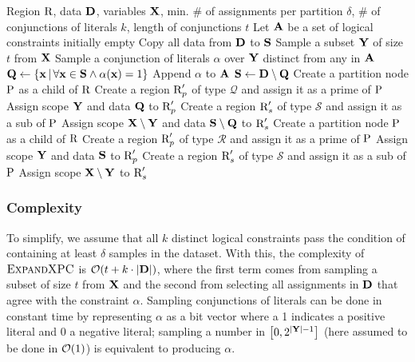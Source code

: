 \begin{algorithm}[t]
  \caption{}\label{alg:xpcs-expand}
  \begin{algorithmic}[1]
    \Require Region $\operatorname{\textrm{R}}$, data $\mathbf{D}$, variables $\mathbf{X}$, min. \# of assignments per
      partition $\delta$, \# of conjunctions of literals $k$, length of conjunctions $t$
    \State Let $\mathbf{A}$ be a set of logical constraints initially empty
    \State Copy all data from $\mathbf{D}$ to $\mathbf{S}$
    \State Sample a subset $\mathbf{Y}$ of size $t$ from $\mathbf{X}$\label{alg:xpcs-expand:line:sample}
      \State Sample a conjunction of literals $\alpha$ over $\mathbf{Y}$ distinct from any in $\mathbf{A}$
      \State $\mathbf{Q}\gets\{\mathbf{x}\,|\,\forall\mathbf{x}\in\mathbf{S}\wedge\alpha(\mathbf{x})=1\}$
        \State Append $\alpha$ to $\mathbf{A}$
        \State $\mathbf{S}\gets\mathbf{D}\setminus\mathbf{Q}$
        \State Create a partition node $\operatorname{\textrm{P}}$ as a child of $\operatorname{\textrm{R}}$
        \State Create a region $\operatorname{\textrm{R}}_p'$ of type $\mathcal{Q}$ and assign it as a prime of
          $\operatorname{\textrm{P}}$
        \State Assign scope $\mathbf{Y}$ and data $\mathbf{Q}$ to $\operatorname{\textrm{R}}_p'$
        \State Create a region $\operatorname{\textrm{R}}_s'$ of type $\mathcal{S}$ and assign it as a sub of
          $\operatorname{\textrm{P}}$
        \State Assign scope $\mathbf{X}\setminus\mathbf{Y}$ and data $\mathbf{S}\setminus\mathbf{Q}$ to $\operatorname{\textrm{R}}_s'$
      \EndIf
    \EndWhile
    \NIElse
      \State Create a partition node $\operatorname{\textrm{P}}$ as a child of $\operatorname{\textrm{R}}$
      \State Create a region $\operatorname{\textrm{R}}_p'$ of type $\mathcal{R}$ and assign it as a prime of
        $\operatorname{\textrm{P}}$
      \State Assign scope $\mathbf{Y}$ and data $\mathbf{S}$ to $\operatorname{\textrm{R}}_p'$
      \State Create a region $\operatorname{\textrm{R}}_s'$ of type $\mathcal{S}$ and assign it as a sub of
        $\operatorname{\textrm{P}}$
      \State Assign scope $\mathbf{X}\setminus\mathbf{Y}$ to $\operatorname{\textrm{R}}_s'$
    \EndNIElse
  \end{algorithmic}
\end{algorithm}

\subsubsection{Complexity}

To simplify, we assume that all $k$ distinct logical constraints pass the condition of containing
at least $\delta$ samples in the dataset. With this, the complexity of $\textproc{ExpandXPC}$ is
$\mathcal{O}(t+k\cdot|\mathbf{D}|)$, where the first term comes from sampling a subset of size $t$ from
$\mathbf{X}$ and the second from selecting all assignments in $\mathbf{D}$ that agree with the constraint
$\alpha$. Sampling conjunctions of literals can be done in constant time by representing $\alpha$
as a bit vector where a 1 indicates a positive literal and 0 a negative literal; sampling a number
in $\left[0,2^{|\mathbf{Y}|-1}\right]$ (here assumed to be done in $\mathcal{O}(1)$) is equivalent to
producing $\alpha$.

